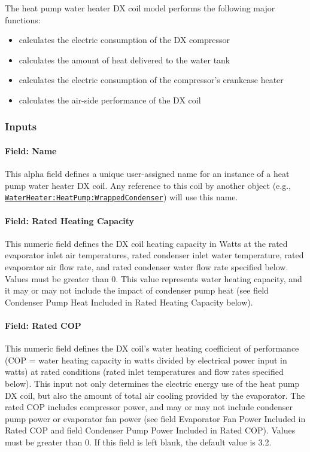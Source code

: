 The heat pump water heater DX coil model performs the following major functions:

\begin{itemize}
\item
  calculates the electric consumption of the DX compressor
\item
  calculates the amount of heat delivered to the water tank
\item
  calculates the electric consumption of the compressor's crankcase heater
\item
  calculates the air-side performance of the DX coil
\end{itemize}

\subsubsection{Inputs}\label{inputs-28}

\paragraph{Field: Name}\label{field-name-27-000}

This alpha field defines a unique user-assigned name for an instance of a heat pump water heater DX coil. Any reference to this coil by another object (e.g., \hyperref[waterheaterheatpumpwrappedcondenser]{\lstinline!WaterHeater:HeatPump:WrappedCondenser!}) will use this name.

\paragraph{Field: Rated Heating Capacity}\label{field-rated-heating-capacity-1}

This numeric field defines the DX coil heating capacity in Watts at the rated evaporator inlet air temperatures, rated condenser inlet water temperature, rated evaporator air flow rate, and rated condenser water flow rate specified below. Values must be greater than 0. This value represents water heating capacity, and it may or may not include the impact of condenser pump heat (see field Condenser Pump Heat Included in Rated Heating Capacity below).

\paragraph{Field: Rated COP}\label{field-rated-cop-1}

This numeric field defines the DX coil's water heating coefficient of performance (COP = water heating capacity in watts divided by electrical power input in watts) at rated conditions (rated inlet temperatures and flow rates specified below). This input not only determines the electric energy use of the heat pump DX coil, but also the amount of total air cooling provided by the evaporator. The rated COP includes compressor power, and may or may not include condenser pump power or evaporator fan power (see field Evaporator Fan Power Included in Rated COP and field Condenser Pump Power Included in Rated COP). Values must be greater than 0. If this field is left blank, the default value is 3.2.

